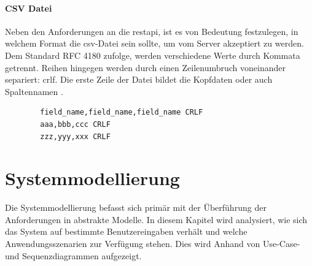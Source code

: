 \paragraph{CSV Datei} Neben den Anforderungen an die \gls{restapi}, ist es von Bedeutung festzulegen, in welchem Format die \gls{csv}-Datei sein sollte, um vom Server akzeptiert zu werden. Dem Standard RFC 4180 zufolge, werden verschiedene Werte durch Kommata getrennt. Reihen hingegen werden durch einen Zeilenumbruch voneinander separiert: \gls{crlf}. Die erste Zeile der Datei bildet die Kopfdaten oder auch Spaltennamen \cite{nwg.csv.1999}.

\begin{verbatim}
        field_name,field_name,field_name CRLF
        aaa,bbb,ccc CRLF
        zzz,yyy,xxx CRLF
\end{verbatim}


\section{Systemmodellierung} \label{sec:systemmodeling}
Die Systemmodellierung befasst sich primär mit der Überführung der Anforderungen in abstrakte Modelle. In diesem Kapitel wird analysiert, wie sich das System auf bestimmte Benutzereingaben verhält und welche Anwendungsszenarien zur Verfügung stehen. Dies wird Anhand von Use-Case- und Sequenzdiagrammen aufgezeigt. \cite{Sommerville.2016}

